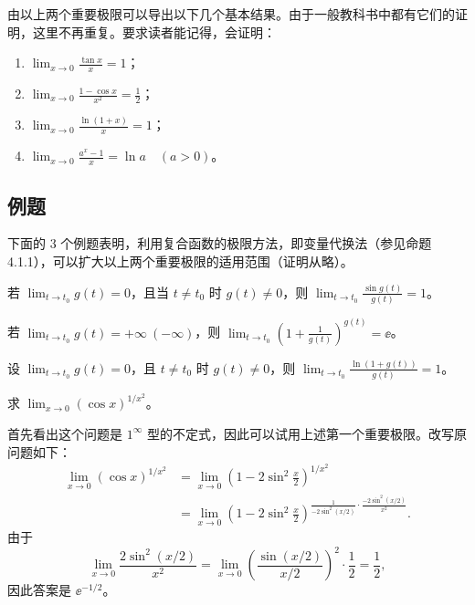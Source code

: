 由以上两个重要极限可以导出以下几个基本结果。由于一般教科书中都有它们的证明，这里不再重复。要求读者能记得，会证明：
\begin{enumerate}
  \item $\displaystyle\lim_{x\to0}\frac{\tan x}{x}=1$；
  \item $\displaystyle\lim_{x\to0}\frac{1-\cos x}{x^2}=\frac12$；
  \item $\displaystyle\lim_{x\to0}\frac{\ln(1+x)}x=1$；
  \item $\displaystyle\lim_{x\to0}\frac{a^x-1}{x}=\ln a\quad(a>0)$。
\end{enumerate}

\subsection{例题}

下面的 3 个例题表明，利用复合函数的极限方法，即变量代换法（参见命题 4.1.1），可以扩大以上两个重要极限的适用范围（证明从略）。

\begin{xexample}[4.3.1]
若 $\lim_{t\to t_0}g(t)=0$，且当 $t\ne t_0$ 时 $g(t)\ne0$，则 $\displaystyle\lim_{t\to t_0}\frac{\sin g(t)}{g(t)}=1$。
\end{xexample}

\begin{xexample}[4.3.2]
若 $\lim_{t\to t_0}g(t)=+\infty\ (-\infty)$，则 $\displaystyle\lim_{t\to t_0}\left(1+\frac1{g(t)}\right)^{g(t)}=\ee$。
\end{xexample}

\begin{xexample}[4.3.3]
设 $\lim_{t\to t_0}g(t)=0$，且 $t\ne t_0$ 时 $g(t)\ne0$，则 $\displaystyle\lim_{t\to t_0}\frac{\ln(1+g(t))}{g(t)}=1$。
\end{xexample}

\begin{xexample}[4.3.4]
求 $\displaystyle\lim_{x\to0}(\cos x)^{1/x^2}$。
\end{xexample}
\begin{xsolution}
首先看出这个问题是 $1^\infty$ 型的不定式，因此可以试用上述第一个重要极限。改写原问题如下：
\begin{align*}
  \lim_{x\to0}(\cos x)^{1/x^2}
  &=\lim_{x\to0}\left(1-2\sin^2\frac x2\right)^{1/x^2}\\
  &=\lim_{x\to0}\left(1-2\sin^2\frac x2\right)^{\frac1{-2\sin^2(x/2)}\cdot\frac{-2\sin^2(x/2)}{x^2}}.
\end{align*}
由于
\[
  \lim_{x\to0}\frac{2\sin^2(x/2)}{x^2}
  =\lim_{x\to0}\left(\frac{\sin(x/2)}{x/2}\right)^2\cdot\frac12=\frac12,
\]
因此答案是 $\ee^{-1/2}$。
\end{xsolution}


